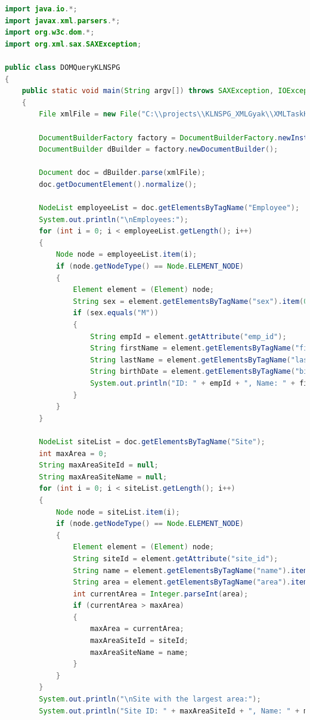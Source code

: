 \documentclass[12pt]{report}
\begin{document}
\begin{lstlisting}[caption={DOMQueryKLNSPG.java} olvasó program, language=Java]
import java.io.*;
import javax.xml.parsers.*;
import org.w3c.dom.*;
import org.xml.sax.SAXException;

public class DOMQueryKLNSPG
{
	public static void main(String argv[]) throws SAXException, IOException, ParserConfigurationException
	{
		File xmlFile = new File("C:\\projects\\KLNSPG_XMLGyak\\XMLTaskKLNSPG\\XMLKLNSPG.xml");
		
		DocumentBuilderFactory factory = DocumentBuilderFactory.newInstance();
		DocumentBuilder dBuilder = factory.newDocumentBuilder();
		
		Document doc = dBuilder.parse(xmlFile);
		doc.getDocumentElement().normalize();
		
		NodeList employeeList = doc.getElementsByTagName("Employee");
		System.out.println("\nEmployees:");
		for (int i = 0; i < employeeList.getLength(); i++)
		{
			Node node = employeeList.item(i);
			if (node.getNodeType() == Node.ELEMENT_NODE)
			{
				Element element = (Element) node;
				String sex = element.getElementsByTagName("sex").item(0).getTextContent();
				if (sex.equals("M"))
				{
					String empId = element.getAttribute("emp_id");
					String firstName = element.getElementsByTagName("first_name").item(0).getTextContent();
					String lastName = element.getElementsByTagName("last_name").item(0).getTextContent();
					String birthDate = element.getElementsByTagName("birth_date").item(0).getTextContent();
					System.out.println("ID: " + empId + ", Name: " + firstName + " " + lastName + ", Birth Date: " + birthDate + ", Sex: " + sex);
				}
			}
		}
		
		NodeList siteList = doc.getElementsByTagName("Site");
		int maxArea = 0;
		String maxAreaSiteId = null;
		String maxAreaSiteName = null;
		for (int i = 0; i < siteList.getLength(); i++)
		{
			Node node = siteList.item(i);
			if (node.getNodeType() == Node.ELEMENT_NODE)
			{
				Element element = (Element) node;
				String siteId = element.getAttribute("site_id");
				String name = element.getElementsByTagName("name").item(0).getTextContent();
				String area = element.getElementsByTagName("area").item(0).getTextContent();
				int currentArea = Integer.parseInt(area);
				if (currentArea > maxArea)
				{
					maxArea = currentArea;
					maxAreaSiteId = siteId;
					maxAreaSiteName = name;
				}
			}
		}
		System.out.println("\nSite with the largest area:");
		System.out.println("Site ID: " + maxAreaSiteId + ", Name: " + maxAreaSiteName + ", Area: " + maxArea);
		

\end{lstlisting}
\end{document}
